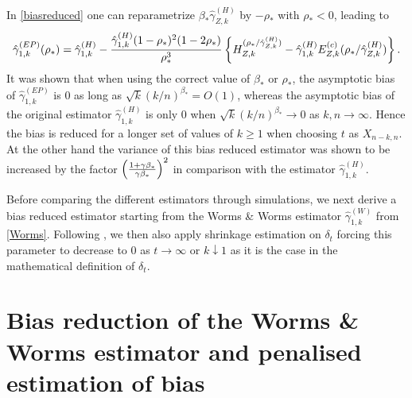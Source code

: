 In \eqref{biasreduced} one can reparametrize $\beta_* \hat{\gamma}_{Z,k}^{(H)}$ by $-\rho_*$ with $\rho_* <0$, leading to
\begin{equation}
\hat{\gamma}_{1,k}^{(EP)}(\rho_*)=
\hat{\gamma}_{1,k}^{(H)}- 
{\hat{\gamma}_{1,k}^{(H)} (1-\rho_*)^2(1-2\rho_*)\over \rho_*^3}
\left\{
H_{Z,k}^{(\rho_*/ \hat{\gamma}_{Z,k}^{(H)})}-\hat{\gamma}_{1,k}^{(H)}E_{Z,k}^{(c)}(\rho_*/ \hat{\gamma}_{Z,k}^{(H)})
 \right\}.
\label{EPrho}
\end{equation}
It was shown that when using the correct value of $\beta_*$ or $\rho_*$, the asymptotic bias of $\hat{\gamma}_{1,k}^{(EP)}$ is 0 as long as $\sqrt{k} (k/n)^{\beta_*} = O(1)$, whereas the asymptotic bias of the original estimator $\hat{\gamma}^{(H)}_{1,k}$ is only 0 when $\sqrt{k} (k/n)^{\beta_*} \to 0$ as $k,n \to \infty$. Hence the bias is reduced for a longer set of values of $k \geq 1$ when choosing $t$ as $X_{n-k,n}$. At the other hand the variance of this bias reduced estimator was shown to be increased by the factor $\left({1+\gamma\beta_*\over \gamma \beta_*} \right)^2$ in comparison with the estimator $\hat{\gamma}^{(H)}_{1,k}$.

\vspace{0.3cm}
Before comparing the different estimators through simulations, we next derive a bias reduced estimator starting from the Worms \& Worms estimator $\hat{\gamma}_{1,k}^{(W)}$ from \eqref{Worms}. Following \cite{beirlant2017using}, we then also apply shrinkage estimation on $\delta_t$ forcing this parameter to decrease to $0$ as $t \to \infty$ or $k \downarrow 1$ as it is the case in the mathematical definition of $\delta_t$.

\section{Bias reduction of the Worms \& Worms estimator and penalised estimation of bias } 
\label{chap4::Sec3}

